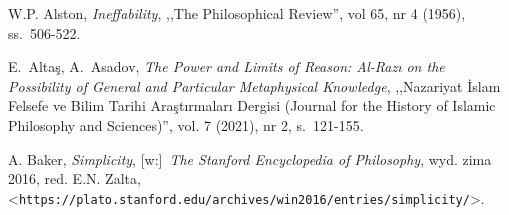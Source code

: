 \begin{thebibliography}{100}

\providecommand{\url}[1]{\texttt{#1}}
\providecommand{\urlprefix}{URL }
\providecommand{\selectlanguage}[1]{\relax}

\newcommand{\Capitalize}[1]{\uppercase{#1}}
\newcommand{\capitalize}[1]{\expandafter\Capitalize#1}
\providecommand{\bibAnnoteFile}[1]{%
  \IfFileExists{#1}{\begin{quotation}\noindent\textsc{Key:} #1\\
  \textsc{Annotation:}\ \end{quotation}}{}}
\providecommand{\bibAnnote}[2]{%
  \begin{quotation}\noindent\textsc{Key:} #1\\
  \textsc{Annotation:}\ #2\end{quotation}}


W.P. Alston, \textit{Ineffability}, ,,The Philosophical Review'', vol 65, nr 4 (1956), ss.~506-522.

E.~Altaş, A.~Asadov, \textit{The Power and Limits of Reason: Al-Razı on the Possibility of General and Particular Metaphysical Knowledge},
,,Nazariyat İslam Felsefe ve Bilim Tarihi Araştırmaları Dergisi (Journal for the History of Islamic Philosophy and Sciences)'', vol. 7 (2021), nr 2, s.~121-155.



A. Baker, \textit{Simplicity}, [w:]~\textit{The Stanford Encyclopedia of Philosophy},
wyd. zima 2016, red. E.N. Zalta, {\textless}\url{https://plato.stanford.edu/archives/win2016/entries/simplicity/}{\textgreater}.


\end{thebibliography}
